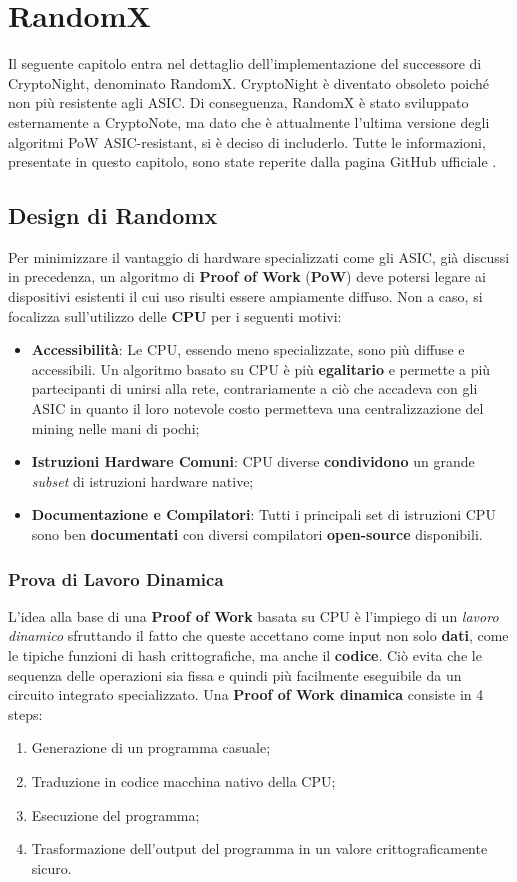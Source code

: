 \chapter{RandomX}
Il seguente capitolo entra nel dettaglio dell'implementazione del successore di CryptoNight, denominato RandomX. CryptoNight è diventato obsoleto poiché non più resistente agli ASIC. Di conseguenza, RandomX è stato sviluppato esternamente a CryptoNote, ma dato che è attualmente l'ultima versione degli algoritmi PoW ASIC-resistant, si è deciso di includerlo. 
Tutte le informazioni, presentate in questo capitolo, sono state reperite dalla pagina GitHub ufficiale \cite{randomx}.

\section{Design di Randomx}
Per minimizzare il vantaggio di hardware specializzati come gli ASIC, già discussi in precedenza, un algoritmo di \textbf{Proof of Work} (\textbf{PoW}) deve potersi legare ai dispositivi esistenti il cui uso risulti essere ampiamente diffuso. Non a caso, si focalizza sull'utilizzo delle \textbf{CPU} per i seguenti motivi:

\begin{itemize}
    \item \textbf{Accessibilità}: Le CPU, essendo meno specializzate, sono più diffuse e accessibili. Un algoritmo basato su CPU è più \textbf{egalitario} e permette a più partecipanti di unirsi alla rete, contrariamente a ciò che accadeva con gli ASIC in quanto il loro notevole costo permetteva una centralizzazione del mining nelle mani di pochi;
    \item \textbf{Istruzioni Hardware Comuni}: CPU diverse \textbf{condividono} un grande \textit{subset} di istruzioni hardware native;
    \item \textbf{Documentazione e Compilatori}: Tutti i principali set di istruzioni CPU sono ben \textbf{documentati} con diversi compilatori \textbf{open-source} disponibili.
\end{itemize}

\subsection{Prova di Lavoro Dinamica} 
L'idea alla base di una \textbf{Proof of Work} basata su CPU è l'impiego di un \textit{lavoro dinamico} sfruttando il fatto che queste accettano come input non solo \textbf{dati}, come le tipiche funzioni di hash crittografiche, ma anche il \textbf{codice}. Ciò evita che le sequenza delle operazioni sia fissa e quindi più facilmente eseguibile da un circuito integrato specializzato. Una \textbf{Proof of Work dinamica} consiste in 4 steps:
\begin{enumerate}
    \item Generazione di un programma casuale;
    \item Traduzione in codice macchina nativo della CPU;
    \item Esecuzione del programma;
    \item Trasformazione dell'output del programma in un valore crittograficamente sicuro.
\end{enumerate}

